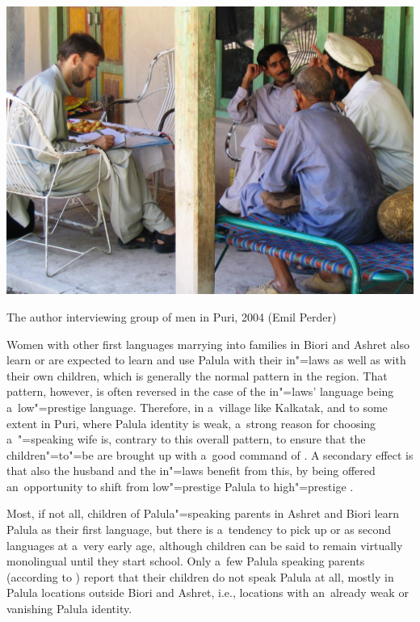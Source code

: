 \begin{photofigure} [t]
 \includegraphics[width=\textwidth]{photos/Photo08--InterviewingPuri.JPG}
\caption{The author interviewing group of men in Puri, 2004 (Emil Perder)}
\end{photofigure}

Women with other first languages marrying into families in Biori and Ashret also learn or are expected to learn and use Palula with their in"=laws as well as with their own children, which is generally the normal pattern in the region. That pattern, however, is often reversed in the case of the in"=laws' language being a~low"=prestige language. Therefore, in a~village like Kalkatak, and to some extent in Puri, where Palula identity is weak, a~strong reason for choosing a~\iliKhowar"=speaking wife is, contrary to this overall pattern, to ensure that the children"=to"=be are brought up with a~good command of \iliKhowar. A secondary effect is that also the husband and the in"=laws benefit from this, by being offered an~opportunity to shift from low"=prestige Palula to high"=prestige \iliKhowar.


Most, if not all, children of Palula"=speaking parents in Ashret and Biori learn Palula as their first language, but there is a~tendency to pick up \iliKhowar or \iliPashto as second languages at a~very early age, although children can be said to remain virtually monolingual until they start school. Only a~few Palula speaking parents (according to \citealt{decker1992a}) report that their children do not speak Palula at all, mostly in Palula locations outside Biori and Ashret, i.e., locations with an~already weak or vanishing Palula identity. 


